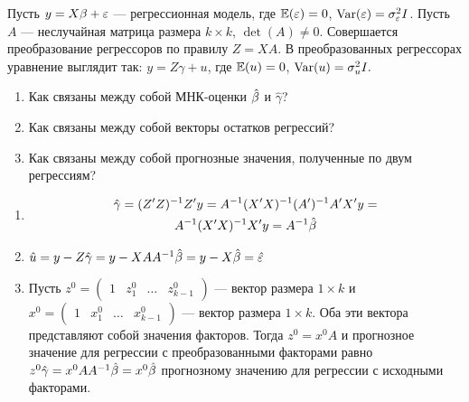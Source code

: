 \begin{problem}
Пусть $y = X\beta + \varepsilon$ — регрессионная модель, где $\mathbb{E}(\varepsilon)=0$, $\operatorname{Var}(\varepsilon)=\sigma_{\varepsilon}^2 I$. Пусть $A$ — неслучайная матрица размера $k \times k$, $\det(A) \not= 0.$ Совершается преобразование регрессоров по правилу $Z=XA$. В преобразованных регрессорах уравнение выглядит так: $y = Z\gamma + u$, где $\mathbb{E}(u)=0$, $\operatorname{Var}(u)=\sigma_{u}^2 I.$

\begin{enumerate}
\item Как связаны между собой МНК-оценки $\hat{\beta}$ и $\hat{\gamma}$?
\item Как связаны между собой векторы остатков регрессий?
\item Как связаны между собой прогнозные значения, полученные по двум регрессиям?
\end{enumerate}


\begin{sol}
\begin{enumerate}
\item
\begin{multline*}
\hat{\gamma} = (Z'Z)^{-1}Z'y = A^{-1}(X'X)^{-1}(A')^{-1}A'X'y =\\
 A^{-1}(X'X)^{-1} X'y = A^{-1}\hat{\beta}
\end{multline*}
\item $\hat{u} = y - Z\hat{\gamma} = y - XAA^{-1}\hat{\beta} = y - X\hat{\beta} = \hat{\varepsilon}$
\item Пусть $z^0 = \begin{pmatrix} 1 & z_1^0 & \dots & z_{k-1}^0 \end{pmatrix}$ — вектор размера $1 \times k$ и $x^0 = \begin{pmatrix} 1 & x_1^0 & \dots & x_{k-1}^0 \end{pmatrix}$ — вектор размера $1 \times k$. Оба эти вектора представляют собой значения факторов. Тогда $z^0 = x^0 A$ и прогнозное значение для регрессии с преобразованными факторами равно $z^0 \hat{\gamma} = x^0 AA^{-1} \hat{\beta} = x^0 \hat{\beta}$ прогнозному значению для регрессии с исходными факторами.
\end{enumerate}
\end{sol}
\end{problem}




